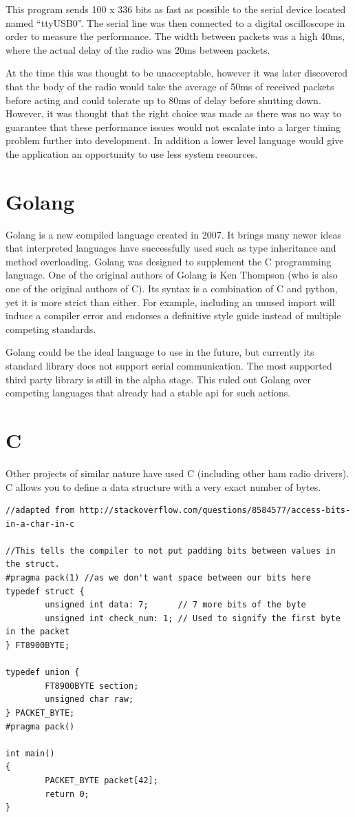 This program sends 100 x 336 bits as fast as possible to the serial device located named ``ttyUSB0''. The serial line was then connected to a digital oscilloscope in order to measure the performance. The width between packets was a high 40ms, where the actual delay of the radio was 20ms between packets.

At the time this was thought to be unacceptable, however it was later discovered that the body of the radio would take the average of 50ms of received packets before acting and could tolerate up to 80ms of delay before shutting down\cite[pg.21]{ben_report}. However, it was thought that the right choice was made as there was no way to guarantee that these performance issues would not escalate into a larger timing problem further into development. In addition a lower level language would give the application an opportunity to use less system resources.

\section*{Golang}
Golang is a new compiled language created in 2007. It brings many newer ideas that interpreted languages have successfully used such as type inheritance and method overloading. Golang was designed to supplement the C programming language. One of the original authors of Golang is Ken Thompson (who is also one of the original authors of C). Its syntax is a combination of C and python, yet it is more strict than either. For example, including an unused import will induce a compiler error and endorses a definitive style guide instead of multiple competing standards.

Golang could be the ideal language to use in the future, but currently its standard library does not support serial communication. The most supported third party library is still in the alpha stage. This ruled out Golang over competing languages that already had a stable \gls{api} for such actions.

\section*{C}
Other projects of similar nature have used C (including other ham radio drivers). C allows you to define a data structure with a very exact number of bytes.

\begin{verbatim}
//adapted from http://stackoverflow.com/questions/8584577/access-bits-in-a-char-in-c

//This tells the compiler to not put padding bits between values in the struct.
#pragma pack(1) //as we don't want space between our bits here
typedef struct {
        unsigned int data: 7;      // 7 more bits of the byte
        unsigned int check_num: 1; // Used to signify the first byte in the packet
} FT8900BYTE;

typedef union { 
        FT8900BYTE section;
        unsigned char raw;
} PACKET_BYTE;
#pragma pack()

int main()
{
        PACKET_BYTE packet[42];
        return 0;
}
\end{verbatim}

